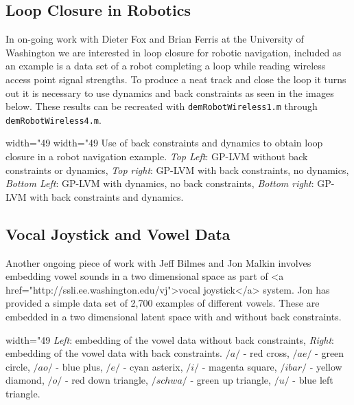 {\subsection{Loop Closure in Robotics}

In on-going work with Dieter Fox and Brian Ferris at the University of Washington we are interested in loop closure for robotic navigation, included as an example is a data set of a robot completing a loop while reading wireless access point signal strengths. To produce a neat track and close the loop it turns out it is necessary to use dynamics and back constraints as seen in the images below. These results can be recreated with \texttt{demRobotWireless1.m} through \texttt{demRobotWireless4.m}.
}

\begin{center} width="49%
 width="49%
Use of back constraints and dynamics to obtain loop closure in a robot navigation example. \emph{Top Left}: GP-LVM without back constraints or dynamics, \emph{Top right}: GP-LVM with back constraints, no dynamics, \emph{Bottom Left}: GP-LVM with dynamics, no back constraints, \emph{Bottom right}: GP-LVM with back constraints and dynamics. \end{center}

\subsection{Vocal Joystick and Vowel Data}

Another ongoing piece of work with Jeff Bilmes and Jon Malkin involves embedding vowel sounds in a two dimensional space as part of <a href="http://ssli.ee.washington.edu/vj">vocal joystick</a> system. Jon has provided a simple data set of 2,700 examples of different vowels. These are embedded in a two dimensional latent space with and without back constraints.

\begin{center} width="49%
\emph{Left}: embedding of the vowel data without back constraints, \emph{Right}: embedding of the vowel data with back constraints. $/a/$ - red cross, $/ae/$ - green circle, $/ao/$ - blue plus, $/e/$ - cyan asterix, $/i/$ - magenta square, $/ibar/$ - yellow diamond, $/o/$ - red down triangle, $/schwa/$ - green up triangle, $/u/$ - blue left triangle.
\end{center}

